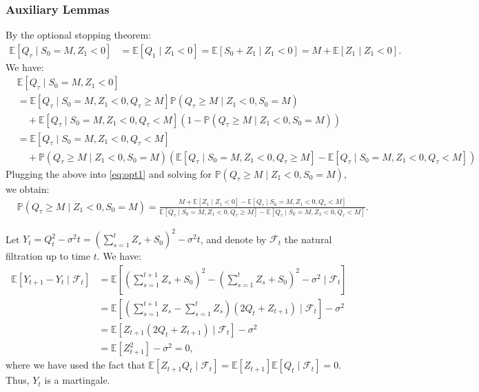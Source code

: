 \documentclass[mnsc,nonblindrev]{informs3}
\newcommand{\E}{\mathbb{E}}
\newcommand{\pr}{\mathbb{P}}
\renewcommand{\Pr}{\pr}
\newcommand{\Exp}[1]{\mathbb{E} \left[ #1 \right]} %
\renewenvironment{proof}[1][Proof]{%
  \par\noindent{\itshape #1.} \ignorespaces
}{%
  \hfill\Halmos\par
}
\begin{document}
\begin{APPENDICES}
\subsubsection{Auxiliary Lemmas}\label{appsec:martingales}


\OptStoppingStatic*
\begin{proof}
By the optional stopping theorem:
\begin{align}\label{eq:opt1}
\E\left[Q_\tau \mid S_0 = M, Z_1 < 0\right] &= \E[Q_1 \mid Z_1 < 0] = \Exp{S_0 + Z_1 \mid Z_1 < 0} = M + \Exp{Z_1 \mid Z_1 < 0}.
\end{align}
We have:
\begin{align*}%
&\E\left[Q_\tau \mid S_0 = M, Z_1 < 0\right]\\ &= \E[Q_\tau \mid S_0 = M, Z_1 < 0, Q_\tau \geq M]\Pr\left(Q_\tau \geq M \mid Z_1 < 0, S_0 = M\right)\\
&\quad +\E[Q_\tau \mid S_0 = M, Z_1 < 0, Q_\tau < M]\left(1-\Pr\left(Q_\tau \geq M \mid Z_1 < 0, S_0 = M\right)
\right) \\
&= \E[Q_\tau \mid S_0 = M, Z_1 < 0, Q_\tau < M]\\&\quad + \Pr\left(Q_\tau \geq M \mid Z_1 < 0, S_0 = M\right) \left(\E[Q_\tau \mid S_0 = M, Z_1 < 0, Q_\tau \geq M]-\E[Q_\tau \mid S_0 = M, Z_1 < 0, Q_\tau < M]\right)
\end{align*}
Plugging the above into \eqref{eq:opt1} and solving for $\Pr\left(Q_\tau \geq M \mid Z_1 < 0, S_0 = M\right)$, we obtain:
\begin{align*}
&\Pr\left(Q_\tau \geq M \mid Z_1 < 0, S_0 = M\right) = \frac{M+\E[Z_1 \mid Z_1 < 0]-\E[Q_\tau \mid S_0 = M, Z_1 < 0, Q_\tau < M]}{\E[Q_\tau \mid S_0 = M, Z_1 < 0, Q_\tau \geq M]-\E[Q_\tau \mid S_0 = M, Z_1 < 0, Q_\tau < M]}.
\end{align*}
\end{proof}


\MeanZeroMartingale*
\begin{proof}
   Let $Y_{t} = Q_{t}^2 - \sigma^2 t = \left(\sum_{s=1}^t Z_s + S_0\right)^2 - \sigma^2 t$, and denote by $\mathcal{F}_t$ the natural filtration up to time $t$.
   We have: 
    \begin{align*}
        \E[Y_{t+1} - Y_{t} \mid \mathcal{F}_{t}] & = \E\left[\left(\sum_{s=1}^{t+1} Z_s + S_0\right)^2 - \left(\sum_{s=1}^t Z_s + S_0\right)^2 - \sigma^2 \mid \mathcal{F}_{t}\right]\\
        & = \E\left[\left(\sum_{s=1}^{t+1} Z_s- \sum_{s=1}^t Z_s\right)\left( 2Q_{t} + Z_{t+1} \right) \mid \mathcal{F}_{t}\right] - \sigma^2\\
        & = \E[Z_{t+1}\left(2Q_{t} + Z_{t+1} \right) \mid \mathcal{F}_{t}] - \sigma^2\\
        & = \E[Z^2_{t+1}]- \sigma^2 = 0,
    \end{align*}
    where we have used the fact that $\E[Z_{t+1}Q_t \mid \mathcal{F}_t] = \E[Z_{t+1}]\E[Q_t \mid \mathcal{F}_t] = 0$. Thus, $Y_t$ is a martingale. 
    

\end{proof}
\end{APPENDICES}
\end{document}
